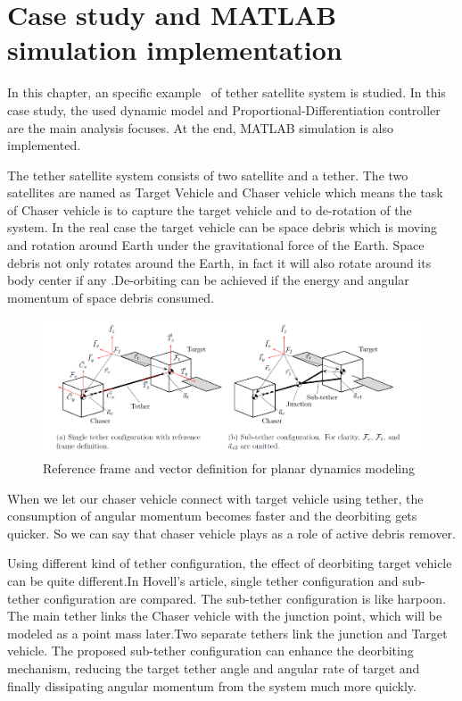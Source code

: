 \chapter{Case study and MATLAB simulation implementation}\label{section-case}
In this chapter, an specific example~\cite{hovell2017experimental} of tether satellite system is studied. In this case study, the used dynamic model and Proportional-Differentiation controller are the main analysis focuses. At the end, MATLAB simulation is also implemented.

The tether satellite system consists of two satellite and a tether. The two satellites are named as Target Vehicle and Chaser vehicle which means the task of Chaser vehicle is to capture the target vehicle and to de-rotation of the system. In the real case the target vehicle can be space debris which is moving and rotation around Earth under the gravitational force of the Earth. Space debris not only rotates around the Earth, in fact it will also rotate around its body center if any .De-orbiting can be achieved if the energy and angular momentum of space debris consumed.
\begin{figure}[ht]

\includegraphics[width=\textwidth]{fig/simulation/ReferenceFrame}
\caption{Reference frame and vector definition for planar dynamics modeling~\cite{hovell2017experimental}}

\end{figure}
When we let our chaser vehicle connect with target vehicle using tether, the consumption of angular momentum becomes faster and the deorbiting gets quicker.  
So we can say that chaser vehicle plays as a role of active debris remover.

Using different kind of tether configuration, the effect of deorbiting target vehicle can be quite different.In Hovell's article, single tether configuration and sub-tether configuration are compared. The sub-tether configuration is like harpoon. The main tether links the Chaser vehicle with the junction point, which will be modeled as a point mass later.Two separate tethers link the junction and Target vehicle. The proposed sub-tether configuration can enhance the deorbiting mechanism, reducing the target tether angle and angular rate of target and finally dissipating angular momentum from the system much more quickly.  
